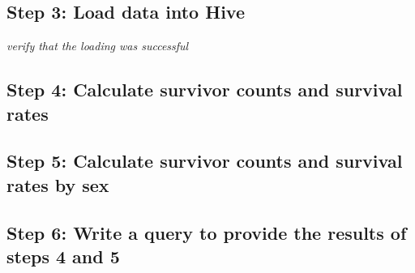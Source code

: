 \documentclass[]{article}
\begin{document}
\subsection*{Step 3: Load data into Hive}
\emph{verify that the loading was successful}
\subsection*{Step 4: Calculate survivor counts and survival rates}
\subsection*{Step 5: Calculate survivor counts and survival rates by sex}
\subsection*{Step 6: Write a query to provide the results of steps 4 and 5}
\end{document}
